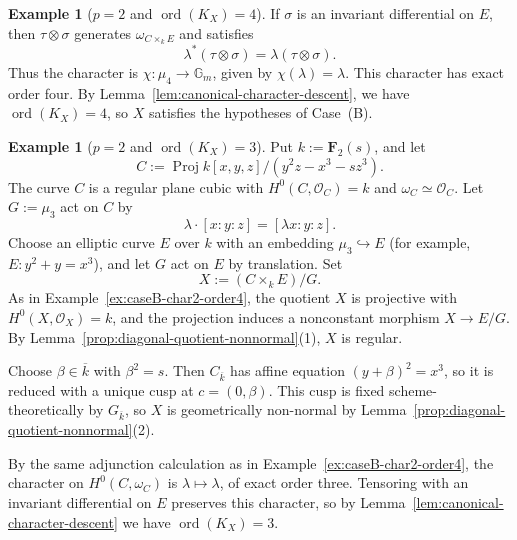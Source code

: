 \documentclass[10pt,abstract=true]{scrartcl}
\numberwithin{equation}{section}
\theoremstyle{definition}
\newtheorem{example}[theorem]{Example}
\theoremstyle{remark}
\DeclareMathOperator\Proj{Proj}
\DeclareMathOperator\ord{ord}
\begin{document}
\begin{example}[$p=2$ and $\ord(K_X)=4$]
  If $\sigma$ is an invariant differential on $E$, then $\tau\otimes\sigma$ generates $\omega_{C\times_kE}$ and satisfies
  \[
    \lambda^*(\tau\otimes\sigma)=\lambda(\tau\otimes\sigma).
  \]
  Thus the character is $\chi\colon\mu_4\to\mathbb G_m$, given by $\chi(\lambda)=\lambda$.
  This character has exact order four.
  By Lemma~\ref{lem:canonical-character-descent}, we have $\ord(K_X)=4$, so $X$ satisfies the hypotheses of Case~\textup{(B)}.
\end{example}

\begin{example}[$p=2$ and $\ord(K_X)=3$]\label{ex:caseB-char2-order3}%
  Put $k:=\mathbf F_2(s)$, and let
  \[
    C:=\Proj k[x,y,z]/(y^2z-x^3-sz^3).
  \]
  The curve $C$ is a regular plane cubic with $H^0(C,\mathcal O_C)=k$ and $\omega_C\simeq\mathcal O_C$.
  Let $G:=\mu_3$ act on $C$ by
  \[
    \lambda\cdot[x:y:z]=[\lambda x:y:z].
  \]
  Choose an elliptic curve $E$ over $k$ with an embedding $\mu_3\hookrightarrow E$ (for example, $E\colon y^2+y=x^3$), and let $G$ act on $E$ by translation.
  Set
  \[
    X:=(C\times_kE)/G.
  \]
  As in Example~\ref{ex:caseB-char2-order4}, the quotient $X$ is projective with $H^0(X,\mathcal O_X)=k$, and the projection induces a nonconstant morphism $X\to E/G$.
  By Lemma~\ref{prop:diagonal-quotient-nonnormal}\textup{(1)}, $X$ is regular.

  Choose $\beta\in\overline{k}$ with $\beta^2=s$.
  Then $C_{\overline{k}}$ has affine equation $(y+\beta)^2=x^3$, so it is reduced with a unique cusp at $c=(0,\beta)$.
  This cusp is fixed scheme-theoretically by $G_{\overline{k}}$, so $X$ is geometrically non-normal by Lemma~\ref{prop:diagonal-quotient-nonnormal}\textup{(2)}.

  By the same adjunction calculation as in Example~\ref{ex:caseB-char2-order4}, the character on $H^0(C,\omega_C)$ is $\lambda\mapsto\lambda$, of exact order three.
  Tensoring with an invariant differential on $E$ preserves this character, so by Lemma~\ref{lem:canonical-character-descent} we have $\ord(K_X)=3$.
\end{example}
\end{document}
